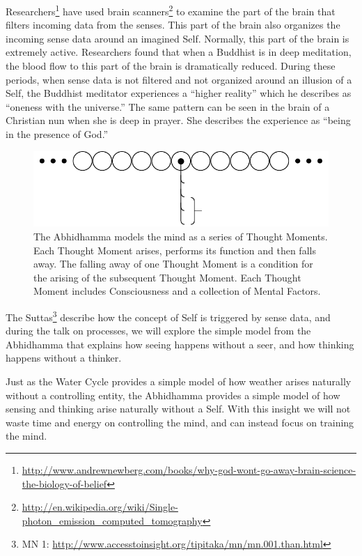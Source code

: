 Researchers\footnote{\url{http://www.andrewnewberg.com/books/why-god-wont-go-away-brain-science-the-biology-of-belief}} have used brain scanners\footnote{\url{http://en.wikipedia.org/wiki/Single-photon_emission_computed_tomography}} to examine the part of the brain that filters incoming data from the senses. This part of the brain also organizes the incoming sense data around an imagined Self. Normally, this part of the brain is extremely active. Researchers found that when a Buddhist is in deep meditation, the blood flow to this part of the brain is dramatically reduced. During these periods, when sense data is not filtered and not organized around an illusion of a Self, the Buddhist meditator experiences a “higher reality” which he describes as “oneness with the universe.” The same pattern can be seen in the brain of a Christian nun when she is deep in prayer. She describes the experience as “being in the presence of God.”

\begin{figure}[H]
\centering
\includegraphics[width=1\linewidth]{./Diagrams/Model}
\caption{The Abhidhamma models the mind as a series of Thought Moments. Each Thought Moment arises, performs its function and then falls away. The falling away of one Thought Moment is a condition for the arising of the subsequent Thought Moment. Each Thought Moment includes Consciousness and a collection of Mental Factors.}
\label{fig:Model}
\end{figure}

The Suttas\footnote{MN 1: \url{http://www.accesstoinsight.org/tipitaka/mn/mn.001.than.html}} describe how the concept of Self is triggered by sense data, and during the talk on processes, we will explore the simple model from the Abhidhamma that explains how seeing happens without a seer, and how thinking happens without a thinker.

Just as the Water Cycle provides a simple model of how weather arises naturally without a controlling entity, the Abhidhamma provides a simple model of how sensing and thinking arise naturally without a Self. With this insight we will not waste time and energy on controlling the mind, and can instead focus on training the mind.

